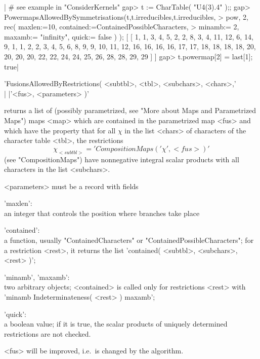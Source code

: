 |    # see example in "ConsiderKernels"
    gap> t := CharTable( "U4(3).4" );;
    gap> PowermapsAllowedBySymmetrisations(t,t.irreducibles,t.irreducibles,
    >      pow, 2, rec( maxlen:=10, contained:=ContainedPossibleCharacters,
    >      minamb:= 2, maxamb:= "infinity", quick:= false ) );
    [ [ 1, 1, 3, 4, 5, 2, 2, 8, 3, 4, 11, 12, 6, 14, 9, 1, 1, 2, 2, 3, 4,
          5, 6, 8, 9, 9, 10, 11, 12, 16, 16, 16, 16, 17, 17, 18, 18, 18,
          18, 20, 20, 20, 20, 22, 22, 24, 24, 25, 26, 28, 28, 29, 29 ] ]
    gap> t.powermap[2] = last[1];
    true|


'FusionsAllowedByRestrictions( <subtbl>, <tbl>, <subchars>, <chars>,'\\
|                               |'<fus>, <parameters> )'

returns a list of (possibly parametrized, see "More about Maps and
Parametrized Maps")
maps <map> which are contained in the parametrized map <fus> and which have
the property that for all $\chi$ in the list <chars> of characters of the
character table <tbl>, the restrictions
      \[ \chi_{<subtbl>} = 'CompositionMaps( '\chi', <fus> )' \]
(see "CompositionMaps") have nonnegative integral scalar products with all
characters in the list <subchars>.

<parameters> must be a record with fields

'maxlen':\\ an integer that controls the position where branches take place

'contained':\\ a function, usually "ContainedCharacters" or
               "ContainedPossibleCharacters"; for a restriction <rest>, it
               returns the list 'contained( <subtbl>, <subchars>, <rest> )';

'minamb', 'maxamb':\\ two arbitrary objects; <contained> is called only for
                      restrictions <rest> with
                      'minamb \< Indeterminateness( <rest> ) \< maxamb';

'quick':\\ a boolean value; if it is true, the scalar products of
           uniquely determined restrictions are not checked.

<fus> will be improved, i.e.\ is changed by the algorithm.

